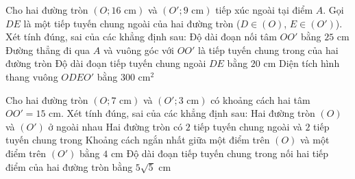 \begin{ex}%
	Cho hai đường tròn $(O; 16\text{ cm})$ và $(O'; 9\text{ cm})$ tiếp xúc ngoài tại điểm $A$. Gọi $DE$ là một tiếp tuyến chung ngoài của hai đường tròn ($D \in (O)$, $E \in (O')$). Xét tính đúng, sai của các khẳng định sau:
	\choiceTF
	{\True Độ dài đoạn nối tâm $OO'$ bằng $25\text{ cm}$}
	{\True Đường thẳng đi qua $A$ và vuông góc với $OO'$ là tiếp tuyến chung trong của hai đường tròn}
	{Độ dài đoạn tiếp tuyến chung ngoài $DE$ bằng $20\text{ cm}$}
	{\True Diện tích hình thang vuông $ODEO'$ bằng $300\text{ cm}^2$}
\end{ex}

\begin{ex}%
	Cho hai đường tròn $(O; 7\text{ cm})$ và $(O'; 3\text{ cm})$ có khoảng cách hai tâm $OO' = 15\text{ cm}$. Xét tính đúng, sai của các khẳng định sau:
	\choiceTF
	{\True Hai đường tròn $(O)$ và $(O')$ ở ngoài nhau}
	{\True Hai đường tròn có $2$ tiếp tuyến chung ngoài và $2$ tiếp tuyến chung trong}
	{Khoảng cách ngắn nhất giữa một điểm trên $(O)$ và một điểm trên $(O')$ bằng $4\text{ cm}$}
	{\True Độ dài đoạn tiếp tuyến chung trong nối hai tiếp điểm của hai đường tròn bằng $5\sqrt{5}\text{ cm}$}
\end{ex}

